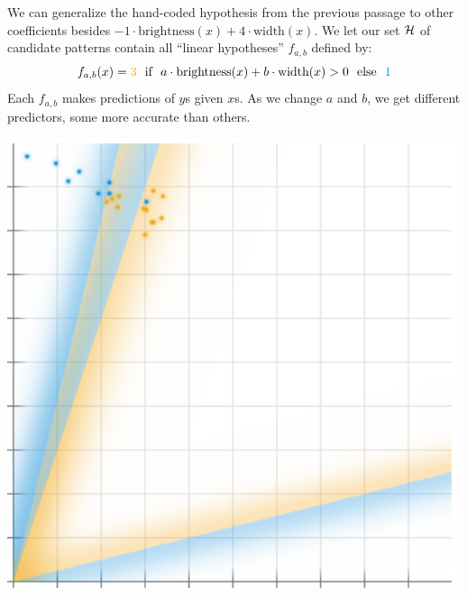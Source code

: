 \pagebreak
{}
  We can generalize the hand-coded hypothesis from the previous passage
  to other coefficients besides $-1\cdot \text{brightness}(x) +4\cdot\text{width}(x)$.  We let our set $\mathcal{H}$ of candidate patterns
  contain all ``linear hypotheses'' $f_{a,b}$ defined by:
  $$
    f_{a,b}(x) = {\rng{3}} \text{~~if~~} a\cdot\text{brightness}(x) + b\cdot\text{width}(x) > 0 \text{~~else~~} {\blu{1}}
  $$
  Each $f_{a,b}$ makes predictions of $y$s given $x$s.  As we change $a$
  and $b$, we get different predictors, some more accurate than others.
  \begin{marginfigure}[-0.0cm]
      \centering
      \includegraphics[width=0.99\textwidth]{example-mnist/train-features.png}%
      \caption{%
        \textbf{Hypotheses differ in training accuracy: feature space.}
        $3$ hypotheses classify training data in the brightness-width
        plane (axes range $[0, 1.0]$).
        Glowing colors distinguish a
        hypothesis' $\blu{1}$ and $\rng{3}$ sides.
        For instance, the bottom-most line classifies all the training points
        as $\rng{3}$s.
        \textbf{Caution}: the colors in this page's two Figures
        represent unrelated distinctions!
      }
      \label{fig:train-features}
  \end{marginfigure}

